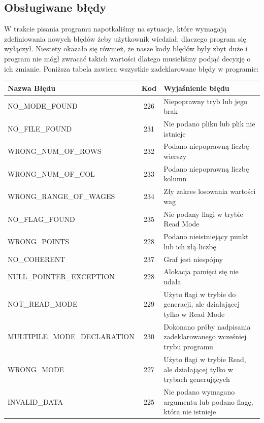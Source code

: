 \documentclass[10pt, a4paper]{report}
\begin{document}
    \subsection{Obsługiwane błędy}
    W trakcie pisania programu napotkaliśmy na sytuacje, które wymagają zdefiniowania nowych błędów żeby użytkownik wiedział, dlaczego program się wyłączył.
    Niestety okazało się również, że nasze kody błędów były zbyt duże i program nie mógł zwracać takich wartości dlatego musieliśmy podjąć decyzję o ich zmianie.
    \newline Poniższa tabela zawiera wszystkie zadeklarowane błędy w programie:
    \newline
    \begin{tabularx}{\textwidth}{ l|c|X } 
        \hline Nazwa Błędu & Kod & Wyjaśnienie błędu\\ 
        \hline NO\_MODE\_FOUND & 226 & Niepoprawny tryb lub jego brak\\ 
        \hline NO\_FILE\_FOUND & 231 & Nie podano pliku lub plik nie istnieje\\ 
        \hline WRONG\_NUM\_OF\_ROWS & 232 & Podano niepoprawną liczbę wierszy\\
        \hline WRONG\_NUM\_OF\_COL & 233 & Podano niepoprawną liczbę kolumn\\
        \hline WRONG\_RANGE\_OF\_WAGES & 234 & Zły zakres losowania wartości wag\\
        \hline NO\_FLAG\_FOUND & 235 & Nie podany flagi w trybie Read Mode\\
        \hline WRONG\_POINTS & 228 & Podano nieistniejący punkt lub ich złą liczbę\\
        \hline NO\_COHERENT & 237 & Graf jest niespójny \\
        \hline NULL\_POINTER\_EXCEPTION & 228 & Alokacja pamięci się nie udała\\
        \hline NOT\_READ\_MODE & 229 & Użyto flagi w trybie do generacji, ale działającej tylko w Read Mode\\
        \hline MULTIPILE\_MODE\_DECLARATION & 230 & Dokonano próby nadpisania zadeklarowanego wcześniej trybu programu\\
        \hline WRONG\_MODE & 227 & Użyto flagi w trybie Read, ale działającej tylko w trybach generujących\\
        \hline INVALID\_DATA & 225 & Nie podano wymagano argumentu lub podano flagę, która nie istnieje\\
        \hline
    \end{tabularx}
\end{document}
